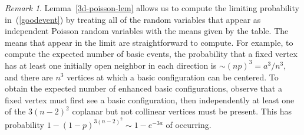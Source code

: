 \documentclass{amsart}
\newcommand{\basic}{\operatorname{\tt Basic}}
\newcommand{\lin}{\operatorname{\tt Line}}
\newcommand{\eline}{\operatorname{\tt Enhanced Line}}
\newcommand{\ebasic}{\operatorname{\tt Enhanced Basic}}
\newcommand{\neline}{\operatorname{\tt NonEnhancedLine}}
\numberwithin{equation}{section}
\theoremstyle{definition}
\theoremstyle{remark}
\newtheorem{remark}[theorem]{Remark}
\begin{document}

\begin{remark}
\label{3d-poisson-rem}
Lemma~\ref{3d-poisson-lem} allows us to compute the limiting probability in~(\ref{goodevent}) by treating all of the random variables that appear as independent Poisson random variables with the means given by the table.  The means that appear in the limit are straightforward to compute.  For example, to compute the expected number of basic events, the probability that a fixed vertex has at least one initially open neighbor in each direction is $\sim (np)^3 = a^3 / n^3$, and there are $n^3$ vertices at which a basic configuration can be centered.  To obtain the expected number of enhanced basic configurations, observe that a fixed vertex must first see a basic configuration, then independently at least one of the $3(n-2)^2$ coplanar but not collinear vertices must be present.  This has probability $1 - (1-p)^{3(n-2)^2} \sim 1 - e^{-3a}$ of occurring. 
\end{remark}
\end{document}
